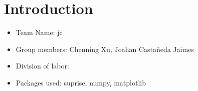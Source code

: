 \newif\ifshowsolutions
\showsolutionstrue

\DeclareMathOperator*{\argmax}{arg\,max}
\DeclareMathOperator*{\argmin}{arg\,min}





\pagestyle{fancy}




\newpage

\section{Introduction}
    \begin{itemize}
        \item Team Name: jc
        \item Group members: Chenning Xu, Joahan Casta\~{n}eda Jaimes
        \item Division of labor:
        \item Packages used: suprise, numpy, matplotlib
    \end{itemize} 
\newpage

